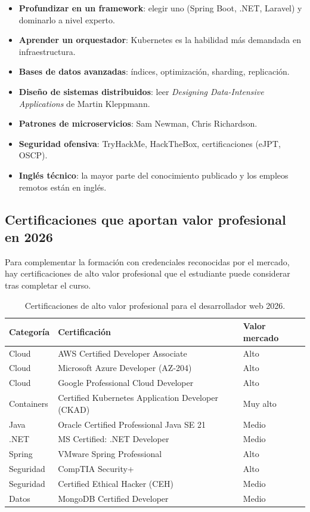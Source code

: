 \begin{itemize}
\item \textbf{Profundizar en un framework}: elegir uno (Spring Boot,
.NET, Laravel) y dominarlo a nivel experto.
\item \textbf{Aprender un orquestador}: Kubernetes es la habilidad
más demandada en infraestructura.
\item \textbf{Bases de datos avanzadas}: índices, optimización,
sharding, replicación.
\item \textbf{Diseño de sistemas distribuidos}: leer
\emph{Designing Data-Intensive Applications} de Martin Kleppmann.
\item \textbf{Patrones de microservicios}: Sam Newman, Chris
Richardson.
\item \textbf{Seguridad ofensiva}: TryHackMe, HackTheBox,
certificaciones (eJPT, OSCP).
\item \textbf{Inglés técnico}: la mayor parte del conocimiento
publicado y los empleos remotos están en inglés.
\end{itemize}

\subsection{Certificaciones que aportan valor profesional en 2026}

Para complementar la formación con credenciales reconocidas
por el mercado, hay certificaciones de alto valor profesional que el
estudiante puede considerar tras completar el curso.


\begin{table}[htbp]
\centering
\caption{Certificaciones de alto valor profesional para el desarrollador web 2026.}
\footnotesize
\begin{tabularx}{\textwidth}{lXl}
\toprule
\textbf{Categoría} & \textbf{Certificación} & \textbf{Valor mercado}\\
\midrule
Cloud & AWS Certified Developer Associate & Alto\\
Cloud & Microsoft Azure Developer (AZ-204) & Alto\\
Cloud & Google Professional Cloud Developer & Alto\\
Containers & Certified Kubernetes Application Developer (CKAD) & Muy alto\\
Java & Oracle Certified Professional Java SE 21 & Medio\\
.NET & MS Certified: .NET Developer & Medio\\
Spring & VMware Spring Professional & Alto\\
Seguridad & CompTIA Security+ & Alto\\
Seguridad & Certified Ethical Hacker (CEH) & Medio\\
Datos & MongoDB Certified Developer & Medio\\
\bottomrule
\end{tabularx}
\end{table}

